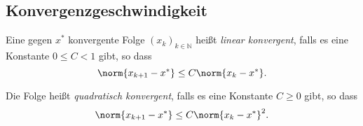 \subsection{Konvergenzgeschwindigkeit}

\begin{defi}
Eine gegen $x^*$ konvergente Folge $(x_k)_{k \in \mathbb{N}}$ heißt \emph{linear konvergent},
falls es eine Konstante $0 \le C < 1$ gibt, so dass
\begin{equation*}
 \norm{ x_{k+1}-x^* } \leq C \norm{ x_k-x^*}.
\end{equation*}

Die Folge heißt \emph{quadratisch konvergent}, falls es eine Konstante $C \geq 0$ gibt,
so dass
\begin{equation*}
 \norm{ x_{k+1}-x^* } \leq C \norm{ x_k-x^* }^2.
\end{equation*}
\end{defi}

